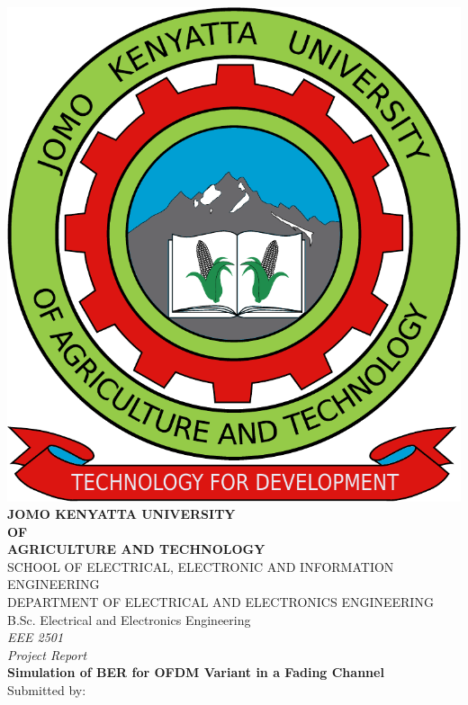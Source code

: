 \begin{spacing}{1.1}
\begin{titlepage}
  \begin{center}
    \includegraphics[scale=0.2]{Graphics/jkuat-logo.pdf}\\
		\vspace{0.5cm}
		{\large\bfseries 
			JOMO KENYATTA UNIVERSITY\\[-2pt]
			OF\\[-2pt]
			AGRICULTURE AND TECHNOLOGY\\
		}
		\vspace{1cm}
		{\small
			SCHOOL OF ELECTRICAL, ELECTRONIC AND INFORMATION ENGINEERING\\
			DEPARTMENT OF ELECTRICAL AND ELECTRONICS ENGINEERING\\
		}
		\vfill
		B.Sc. Electrical and Electronics Engineering\\
		\vfill
		{\itshape
			EEE 2501\\
			Project Report\\
		}
		\vfill
		{\Large\bfseries
			Simulation of BER for OFDM Variant in a Fading Channel\\
		}
		\vfill
		{\normalsize
			Submitted by:
		}\\[0.5cm]

\end{center}
\end{titlepage}
\end{spacing}
